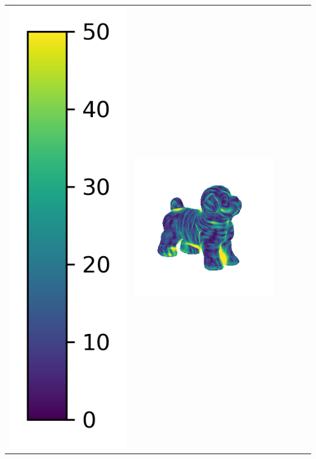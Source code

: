 \begin{center}
\begin{tabularx}{\linewidth}{@{}Y@{}Y@{}Y@{}Y@{}Y@{}Y@{}}
\includegraphics[width=0.2\linewidth]{semisynthetic/colorbar_error_vertical.png} &
\includegraphics[width=\linewidth]{semisynthetic/20150514_17_ours_err.png} &

\end{tabularx}
\end{center}
